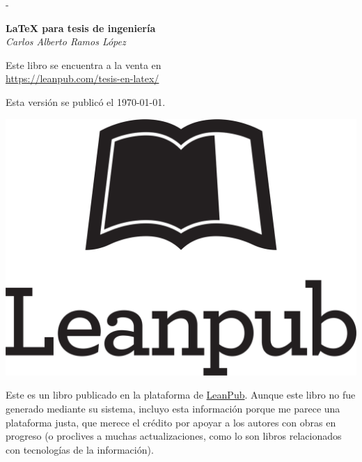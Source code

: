 {
\newpage %
\thispagestyle{empty} %

\begin{adjustwidth}{-\margenAdicional}{}

\vspace*{1cm}

\fontsize{16pt}{0pt}\selectfont
\noindent\textbf{\LaTeX{} para tesis de ingeniería}\\
\fontsize{14pt}{0pt}\selectfont\vspace{4pt}
\newline\emph{Carlos Alberto Ramos López}\\

\vspace*{2cm}
\fontsize{10pt}{0pt}\selectfont

\noindent Este libro se encuentra a la venta en\\
\vspace{2pt}\newline\url{https://leanpub.com/tesis-en-latex/}

\vspace*{2cm}

\noindent Esta versión se publicó el \today.

\vspace*{1cm}

\noindent\begin{minipage}[t]{2cm}
\includegraphics[width=\linewidth]{img/LeanPub.png}
\end{minipage}
\begin{minipage}[t]{\linewidth-2cm}
\vspace{-41pt}
Este es un libro publicado en la plataforma de \href{https://leanpub.com/}{LeanPub}. Aunque este libro no fue generado mediante su sistema, incluyo esta información porque me parece una plataforma justa, que merece el crédito por apoyar a los autores con obras en progreso (o proclives a muchas actualizaciones, como lo son libros relacionados con tecnologías de la información).
\end{minipage}


\end{adjustwidth}}
